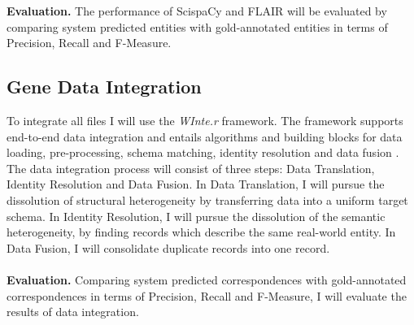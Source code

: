 \documentclass{article}
\begin{document}
\textbf{Evaluation.} The performance of ScispaCy and FLAIR will be evaluated by comparing system predicted entities with gold-annotated entities in terms of Precision, Recall and F-Measure. \\

\subsection{Gene Data Integration}
To integrate all files I will use the \textit{WInte.r} framework. The framework supports end-to-end data integration and entails algorithms and building blocks for data loading, pre-processing, schema matching, identity resolution and data fusion \cite{Lehmberg2017WInterA}. The data integration process will consist of three steps: Data Translation, Identity Resolution and Data Fusion. In Data Translation, I will pursue the dissolution of structural heterogeneity by transferring data into a uniform target schema. In Identity Resolution, I will pursue the dissolution of the semantic heterogeneity, by finding records which describe the same real-world entity. In Data Fusion, I will consolidate duplicate records into one record. \\
\\
\textbf{Evaluation.} Comparing system predicted correspondences with gold-annotated correspondences in terms of Precision, Recall and F-Measure, I will evaluate the results of data integration.


\end{document}
